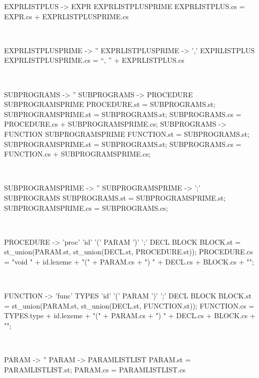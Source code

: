 \begin{verbbox}[\scriptsize]
EXPRLISTPLUS -> EXPR EXPRLISTPLUSPRIME
{
EXPRLISTPLUS.cs  = EXPR.cs + EXPRLISTPLUSPRIME.cs
}
\end{verbbox} 
\theverbbox\\

\begin{verbbox}[\scriptsize]
EXPRLISTPLUSPRIME -> '' {}
EXPRLISTPLUSPRIME -> ',' EXPRLISTPLUS
{
EXPRLISTPLUSPRIME.cs = “, ” + EXPRLISTPLUS.cs
}
\end{verbbox} 
\theverbbox\\

\begin{verbbox}[\scriptsize]
SUBPROGRAMS -> '' {}
SUBPROGRAMS -> PROCEDURE SUBPROGRAMSPRIME
{
PROCEDURE.st = SUBPROGRAMS.st;
SUBPROGRAMSPRIME.st = SUBPROGRAMS.st;
SUBPROGRAMS.cs  = PROCEDURE.cs + SUBPROGRAMSPRIME.cs;
}
SUBPROGRAMS -> FUNCTION SUBPROGRAMSPRIME
{
FUNCTION.st = SUBPROGRAMS.st;
SUBPROGRAMSPRIME.st = SUBPROGRAMS.st;
SUBPROGRAMS.cs  = FUNCTION.cs + SUBPROGRAMSPRIME.cs;
}
\end{verbbox} 
\theverbbox\\

\begin{verbbox}[\scriptsize]
SUBPROGRAMSPRIME -> '' {}
SUBPROGRAMSPRIME -> ';' SUBPROGRAMS
{
SUBPROGRAMS.st = SUBPROGRAMSPRIME.st;
SUBPROGRAMSPRIME.cs = SUBPROGRAMS.cs;
}
\end{verbbox} 
\theverbbox\\

\begin{verbbox}[\scriptsize]
PROCEDURE -> 'proc' 'id' '(' PARAM ')' ';' DECL BLOCK
{
BLOCK.st = st_union(PARAM.st, st_union(DECL.st, PROCEDURE.st));
PROCEDURE.cs = "void " + id.lexeme + "(" + PARAM.cs + ") {\n" + DECL.cs + BLOCK.cs + "\n}\n";
}
\end{verbbox} 
\theverbbox\\

\begin{verbbox}[\scriptsize]
FUNCTION -> 'func' TYPES 'id' '(' PARAM ')' ';' DECL BLOCK
{
BLOCK.st = st_union(PARAM.st, st_union(DECL.st, FUNCTION.st));
FUNCTION.cs = TYPES.type + id.lexeme + "(" + PARAM.cs + ") {\n" + DECL.cs + BLOCK.cs + "\n}\n";
}
\end{verbbox} 
\theverbbox\\

\begin{verbbox}[\scriptsize]
PARAM -> '' {}
PARAM -> PARAMLISTLIST
{
PARAM.st = PARAMLISTLIST.st;
PARAM.cs = PARAMLISTLIST.cs
}
\end{verbbox} 
\theverbbox\\

